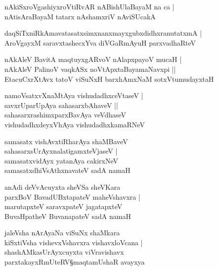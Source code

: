 \begin{shloka}
nAkiSxroVgashiyxroVtiRvAR nABishUlaBayaM na ca |\\
nAtisAraBayaM tatarx nAshamxriV nAviSUcakA 
\end{shloka}

\begin{shloka}
daqSiTxniRkAmavatasatxsimxnanxmayxgubxdidhxranutatxmA |\\
AroVgayxM saravxtashecxYva diVGaRmAyuH parxvadhaRteV 
\end{shloka}

\begin{shloka}
nAkAleV BavitA maqtuyxgARvoV nAlapxpayoV mucaH |\\
nAkAleV PalinoV vaqkASx noVtApxtaBayamaNavxpi ||\\
EtacuCxrXtAvx tatoV viSuNxH barxhAmxNaM sotxVtumudayxtaH 
\end{shloka}

\begin{shloka}
namoVsatxvXnaMtAya vishudadhxceVtaseV |\\
savxrUparUpAya sahasarxbAhaveV ||\\
sahasarxrashimxparxBavAya veVdhaseV\\
vishudadhxdeyxVhAya vishudadhxkamaRNeV 
\end{shloka}

\begin{shloka}
samasatx vishAvxtiRharAya shaMBaveV\\
sahasarxsUrAyxnalatigamxteVjaseV |\\
samasatxvidAyx yatanAya cakirxNeV \\
samasatxdhiVsAthxnavateV sadA namaH 
\end{shloka}

\begin{shloka}
anAdi deVvAcuyxta sheVSa sheVKara\\
parxBoV BavadUBxtapateV maheVshavxra |\\
marutapxteV saravxpateV jagatapxteV \\
BuvaHpatheV BuvanapateV sadA namaH 
\end{shloka}

\begin{shloka}
jaleVsha nArAyaNa viSuNx shaMkara\\
kiSxtiVsha vishevxVshavxra vishavxloVcana |\\
shashAMkasUrAyxcuyxta viVravishavx \\
parxtakayxRmUteRV\S maqtamUshaR avayxya
\end{shloka}

